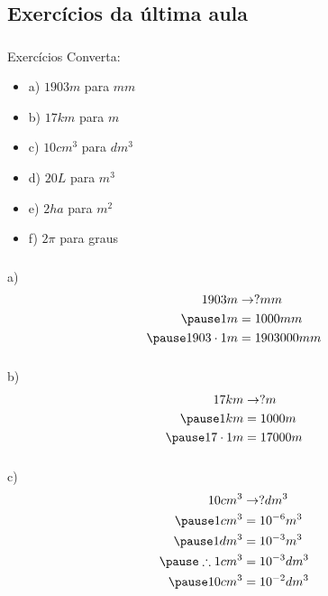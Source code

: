 \documentclass{beamer}
\begin{document}

\subsection{Exercícios da última aula}
\begin{frame}\frametitle{\subsecname}
    \begin{block}{Exercícios}
        Converta:
        \begin{itemize}
            \item a) $1903m$ para $mm$
            \item b) $17km$ para $m$
            \item c) $10cm^3$ para $dm^3$
            \item d) $20L$ para $m^3$
            \item e) $2ha$ para $m^2$
            \item f) $2\pi$ para graus
        \end{itemize}
    \end{block}
\end{frame}


\begin{frame}\frametitle{\subsecname}
    a)
    \begin{align*}
        1903m &\rightarrow ? mm\\ \pause
        1m &= 1000mm \\ \pause
        1903\cdot1m&=1903000mm\\
    \end{align*}
\end{frame}

\begin{frame}\frametitle{\subsecname}
    b)
    \begin{align*}
        17km &\rightarrow ? m\\ \pause
        1km &= 1000m \\ \pause
        17\cdot1m&=17000m\\
    \end{align*}
\end{frame}

\begin{frame}\frametitle{\subsecname}
    c)
    \begin{align*}
        10cm^3 &\rightarrow ? dm^3\\ \pause
        1cm^3 &= 10^{-6}m^3 \\ \pause
        1dm^3 &= 10^{-3}m^3 \\ \pause
        \therefore 1cm^3&=10^{-3}dm^3\\ \pause
        10cm^3 &= 10^{-2}dm^3
    \end{align*}
\end{frame}
\end{document}
